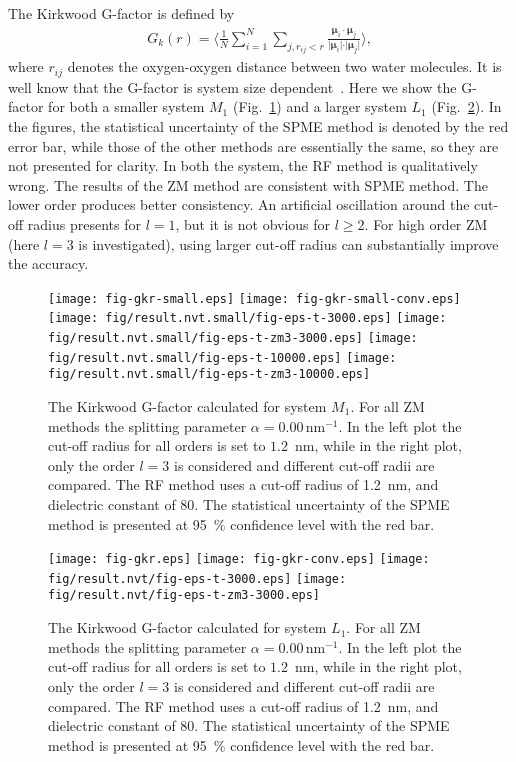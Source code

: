 \documentclass[aip,jcp,a4paper,reprint,unsortedaddress,onecolumn,fleqn]{revtex4-1}
\newcommand{\systemmb}{M_1}
\newcommand{\systemlb}{L_1}
\begin{document}
The Kirkwood G-factor is defined by~\cite{vanderSpoel2006origin}
\begin{align}
  G_k(r) =
  \Big\langle
  \frac 1N
  \sum_{i=1}^N \sum_{j, r_{ij} < r}
  \frac {\boldsymbol\mu_i \cdot \boldsymbol\mu_j}{\vert \boldsymbol\mu_i\vert \cdot \vert\boldsymbol\mu_j\vert}
  \Big\rangle,
\end{align}
where $r_{ij}$ denotes the oxygen-oxygen distance between two water
molecules.  It is well know that the G-factor is system size
dependent~\cite{vanderSpoel2006origin}. Here we show the G-factor for
both a smaller system $\systemmb$ (Fig.~\ref{fig:tmp1}) and a larger system $\systemlb$
(Fig.~\ref{fig:tmp2}).  In the figures, the statistical uncertainty of
the SPME method is denoted by the red error bar, while those of the
other methods are essentially the same, so they are not presented for
clarity.  In both the system, the RF method is qualitatively
wrong. The results of the ZM method are consistent with SPME
method. The lower order produces better consistency.  An artificial
oscillation around the cut-off radius presents for $l=1$, but it is
not obvious for $l\geq 2$.  For high order ZM (here $l=3$ is investigated),
using larger cut-off radius can substantially improve the accuracy.

\begin{figure}
  \centering
  \texttt{[image: fig-gkr-small.eps]}
  \texttt{[image: fig-gkr-small-conv.eps]}
  \texttt{[image: fig/result.nvt.small/fig-eps-t-3000.eps]}
  \texttt{[image: fig/result.nvt.small/fig-eps-t-zm3-3000.eps]}
  \texttt{[image: fig/result.nvt.small/fig-eps-t-10000.eps]}
  \texttt{[image: fig/result.nvt.small/fig-eps-t-zm3-10000.eps]}
  \caption{The Kirkwood G-factor calculated for system $\systemmb$.
    For all ZM methods the splitting parameter $\alpha = 0.00\,\textrm{nm}^{-1}$.
    In the left plot the cut-off radius for all orders is set to $1.2$~nm, while
    in the right plot, only the order $l=3$ is considered and different cut-off radii are compared.
    The RF method uses a cut-off radius of 1.2~nm, and dielectric constant of 80.
    The statistical uncertainty of the SPME method is presented at 95~\% confidence level with the red bar.
  }
  \label{fig:tmp1}
\end{figure}

\begin{figure}
  \centering
  \texttt{[image: fig-gkr.eps]}
  \texttt{[image: fig-gkr-conv.eps]}
  \texttt{[image: fig/result.nvt/fig-eps-t-3000.eps]}
  \texttt{[image: fig/result.nvt/fig-eps-t-zm3-3000.eps]}
  \caption{The Kirkwood G-factor calculated for system $\systemlb$.
    For all ZM methods the splitting parameter $\alpha = 0.00\,\textrm{nm}^{-1}$.
    In the left plot the cut-off radius for all orders is set to $1.2$~nm, while
    in the right plot, only the order $l=3$ is considered and different cut-off radii are compared.
    The RF method uses a cut-off radius of 1.2~nm, and dielectric constant of 80.
    The statistical uncertainty of the SPME method is presented at 95~\% confidence level with the red bar.
  }
  \label{fig:tmp2}
\end{figure}
\end{document}
